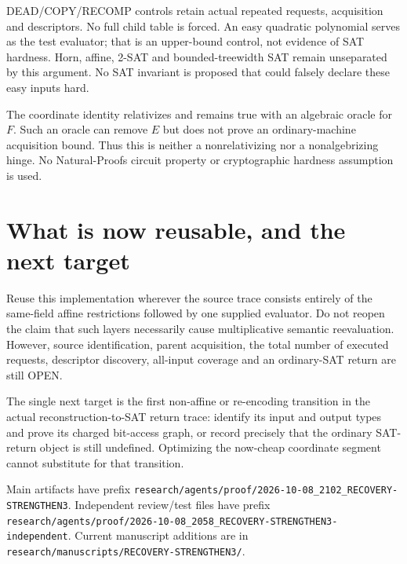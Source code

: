 \documentclass[11pt]{article}
\begin{document}
DEAD/COPY/RECOMP controls retain actual repeated requests, acquisition
and descriptors. No full child table is forced. An easy quadratic
polynomial serves as the test evaluator; that is an upper-bound control,
not evidence of SAT hardness. Horn, affine, 2-SAT and bounded-treewidth
SAT remain unseparated by this argument. No SAT invariant is proposed
that could falsely declare these easy inputs hard.

The coordinate identity relativizes and remains true with an algebraic
oracle for $F$. Such an oracle can remove $E$ but does not prove an
ordinary-machine acquisition bound. Thus this is neither a
nonrelativizing nor a nonalgebrizing hinge. No Natural-Proofs circuit
property or cryptographic hardness assumption is used.

\section*{What is now reusable, and the next target}
Reuse this implementation wherever the source trace consists entirely
of the same-field affine restrictions followed by one supplied evaluator.
Do not reopen the claim that such layers necessarily cause multiplicative
semantic reevaluation. However, source identification, parent acquisition,
the total number of executed requests, descriptor discovery, all-input
coverage and an ordinary-SAT return are still OPEN.

The single next target is the first non-affine or re-encoding transition
in the actual reconstruction-to-SAT return trace: identify its input and
output types and prove its charged bit-access graph, or record precisely
that the ordinary SAT-return object is still undefined. Optimizing the
now-cheap coordinate segment cannot substitute for that transition.

Main artifacts have prefix
\nolinkurl{research/agents/proof/2026-10-08_2102_RECOVERY-STRENGTHEN3}.
Independent review/test files have prefix
\nolinkurl{research/agents/proof/2026-10-08_2058_RECOVERY-STRENGTHEN3-independent}.
Current manuscript additions are in
\nolinkurl{research/manuscripts/RECOVERY-STRENGTHEN3/}.
\end{document}
